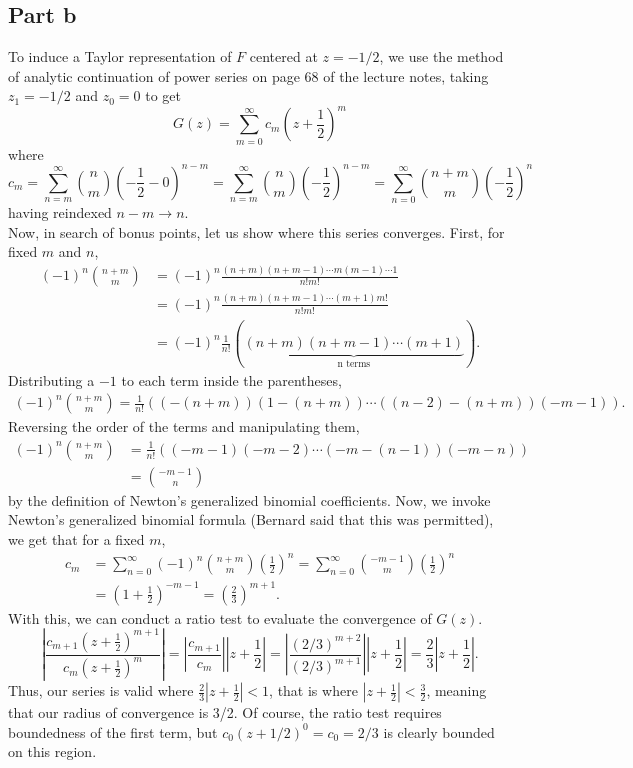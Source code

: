 \documentclass{article}
\begin{document}
\subsection{Part b}
To induce a Taylor representation of $F$ centered at $z=-1/2$, we use the method of analytic continuation of power series on page 68 of the lecture notes, taking $z_1=-1/2$ and $z_0=0$ to get 
\[
G(z)=\sum_{m=0}^{\infty}c_m\left(z+\frac{1}{2}\right)^m
\]
where
\[
c_m=\sum_{n=m}^\infty\binom{n}{m}\left(-\frac{1}{2}-0\right)^{n-m}=\sum_{n=m}^\infty\binom{n}{m}\left(-\frac{1}{2}\right)^{n-m}=\sum_{n=0}^\infty\binom{n+m}{m}\left(-\frac{1}{2}\right)^{n}
\]
having reindexed $n-m\to n$. \\
Now, in search of bonus points, let us show where this series converges. First, for fixed $m$ and $n$,
\begin{align*}
(-1)^n\binom{n+m}{m}&=(-1)^n\frac{(n+m)(n+m-1)\dotsm m(m-1)\dotsm1}{n!m!}\\&=
(-1)^n\frac{(n+m)(n+m-1)\dotsm (m+1)m!}{n!m!}\\&=
(-1)^n\frac{1}{n!}(\underbrace{(n+m)(n+m-1)\dotsm (m+1)}_{\text{n terms}}).
\end{align*}
Distributing a $-1$ to each term inside the parentheses, 
\begin{align*}
(-1)^n\binom{n+m}{m}=\frac{1}{n!}((-(n+m))(1-(n+m))\dotsm((n-2)-(n+m))(-m-1)).
\end{align*}
Reversing the order of the terms and manipulating them,
\begin{align*}
(-1)^n\binom{n+m}{m}&=\frac{1}{n!}((-m-1)(-m-2)\dotsm(-m-(n-1))(-m-n))\\&=
\binom{-m-1}{n}
\end{align*}
by the definition of Newton's generalized binomial coefficients. Now, we invoke Newton's generalized binomial formula (Bernard said that this was permitted), we get that for a fixed $m$,
\begin{align*}
c_m&=\sum_{n=0}^\infty(-1)^n\binom{n+m}{m}\left(\frac{1}{2}\right)^{n}=\sum_{n=0}^\infty\binom{-m-1}{m}\left(\frac{1}{2}\right)^{n}\\&=
\left(1+\frac{1}{2}\right)^{-m-1}=\left(\frac{2}{3}\right)^{m+1}.
\end{align*}
With this, we can conduct a ratio test to evaluate the convergence of $G(z)$.
\[
\left|\frac{c_{m+1}\left(z+\frac{1}{2}\right)^{m+1}}{c_{m}\left(z+\frac{1}{2}\right)^{m}}\right|=\left|\frac{c_{m+1}}{c_m}\right|\left|z+\frac{1}{2}\right|=\left|\frac{(2/3)^{m+2}}{(2/3)^{m+1}}\right|\left|z+\frac{1}{2}\right|=\frac{2}{3}\left|z+\frac{1}{2}\right|.
\]
Thus, our series is valid where $\frac{2}{3}\left|z+\frac{1}{2}\right|<1$, that is where $\left|z+\frac{1}{2}\right|<\frac{3}{2}$, meaning that our radius of convergence is 3/2. Of course, the ratio test requires boundedness of the first term, but $c_0(z+1/2)^0=c_0=2/3$ is clearly bounded on this region.  
\end{document}
